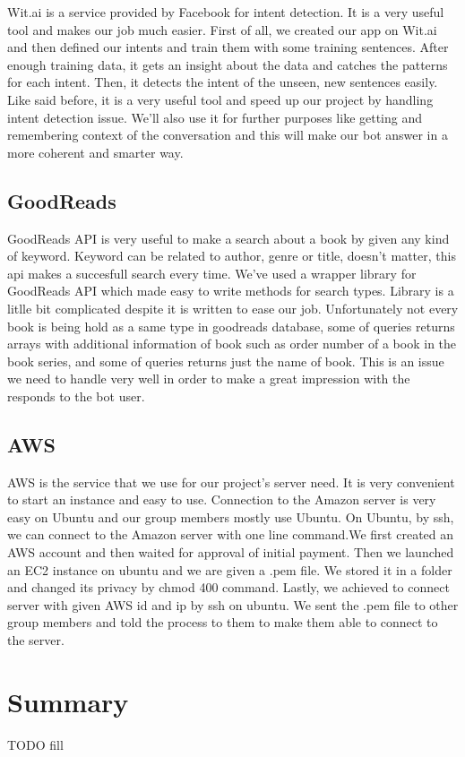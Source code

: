 \documentclass[a4paper]{article}
\begin{document}
\quad Wit.ai is a service provided by Facebook for intent detection. It is a very useful tool and makes our job much easier. First of all, we created our app on Wit.ai and then defined our intents and train them with some training sentences. After enough training data, it gets an insight about the data and catches the patterns for each intent. Then, it detects the intent of the unseen, new sentences easily. Like said before, it is a very useful tool and speed up our project by handling intent detection issue. We'll also use it for further purposes like getting and remembering context of the conversation and this will make our bot answer in a more coherent and smarter way.
\subsection{GoodReads}

\quad GoodReads API is very useful to make a search about a book by given any kind of keyword. Keyword can be related to author, genre or title, doesn't matter, this api makes a succesfull search every time. We've used a wrapper library for GoodReads API which made easy to write methods for search types. Library is a litlle bit complicated despite it is written to ease our job. Unfortunately not every book is being hold as a same type in goodreads database, some of queries returns arrays with additional information of book such as order number of a book in the book series, and some of queries returns just the name of book. This is an issue we need to handle very well in order to make a great impression with the responds to the bot user.  
\subsection{AWS}

\quad AWS is the service that we use for our project's server need. It is very convenient to start an instance and easy to use. Connection to the Amazon server is very easy on Ubuntu and our group members mostly use Ubuntu. On Ubuntu, by ssh, we can connect to the Amazon server with one line command.We first created an AWS account and then waited for approval of initial payment. Then we launched an EC2 instance on ubuntu and we are given a .pem file. We stored it in a folder and changed its privacy by chmod 400 command. Lastly, we achieved to connect server with given AWS id and ip by ssh on ubuntu. We sent the .pem file to other group members and told the process to them to make them able to connect to the server.

\section{Summary}
TODO fill
\end{document}
